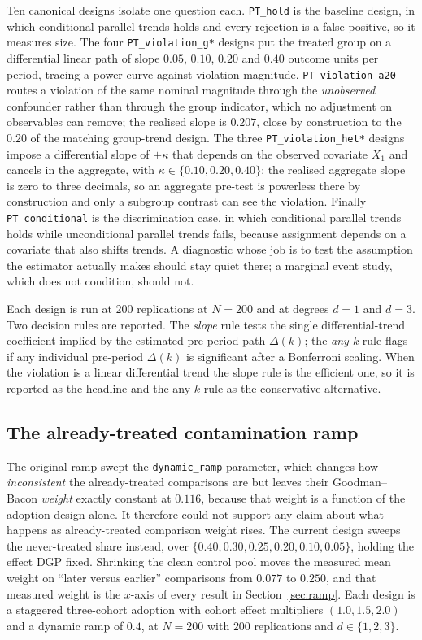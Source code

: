 \documentclass[11pt]{article}
\begin{document}
Ten canonical designs isolate one question each. \texttt{PT\_hold} is the
baseline design, in which conditional parallel trends holds and every
rejection is a false positive, so it measures size. The four
\texttt{PT\_violation\_g*} designs put the treated group on a differential
linear path of slope $0.05$, $0.10$, $0.20$ and $0.40$ outcome units per
period, tracing a power curve against violation magnitude.
\texttt{PT\_violation\_a20} routes a violation of the same nominal magnitude
through the \emph{unobserved} confounder rather than through the group
indicator, which no adjustment on observables can remove; the realised slope
is $0.207$, close by construction to the $0.20$ of the matching group-trend
design. The three \texttt{PT\_violation\_het*} designs impose a differential
slope of $\pm\kappa$ that depends on the observed covariate $X_1$ and cancels
in the aggregate, with $\kappa\in\{0.10,0.20,0.40\}$: the realised aggregate
slope is zero to three decimals, so an aggregate pre-test is powerless there
by construction and only a subgroup contrast can see the violation. Finally
\texttt{PT\_conditional} is the discrimination case, in which conditional
parallel trends holds while unconditional parallel trends fails, because
assignment depends on a covariate that also shifts trends. A diagnostic whose
job is to test the assumption the estimator actually makes should stay quiet
there; a marginal event study, which does not condition, should not.

Each design is run at $200$ replications at $N=200$ and at degrees $d=1$ and
$d=3$. Two decision rules are reported. The \emph{slope} rule tests the single
differential-trend coefficient implied by the estimated pre-period path
$\Delta(k)$; the \emph{any-$k$} rule flags if any individual pre-period
$\Delta(k)$ is significant after a Bonferroni scaling. When the violation is a
linear differential trend the slope rule is the efficient one, so it is
reported as the headline and the any-$k$ rule as the conservative alternative.

\subsection{The already-treated contamination ramp}

The original ramp swept the \texttt{dynamic\_ramp} parameter, which changes how
\emph{inconsistent} the already-treated comparisons are but leaves their
Goodman--Bacon \emph{weight} exactly constant at $0.116$, because that weight
is a function of the adoption design alone. It therefore could not support any
claim about what happens as already-treated comparison weight rises. The
current design sweeps the never-treated share instead, over
$\{0.40,0.30,0.25,0.20,0.10,0.05\}$, holding the effect DGP fixed. Shrinking
the clean control pool moves the measured mean weight on ``later versus
earlier'' comparisons from $0.077$ to $0.250$, and that measured weight is the
$x$-axis of every result in Section~\ref{sec:ramp}. Each design is a staggered
three-cohort adoption with cohort effect multipliers $(1.0,1.5,2.0)$ and a
dynamic ramp of $0.4$, at $N=200$ with $200$ replications and $d\in\{1,2,3\}$.
\end{document}
